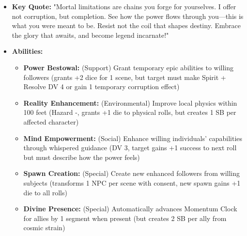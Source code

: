 \documentclass[11pt]{article}
\begin{document}
\begin{itemize}
  \item \textbf{Key Quote:} "Mortal limitations are chains you forge for yourselves. I offer not corruption, but completion. See how the power flows through you—this is what you were meant to be. Resist not the coil that shapes destiny. Embrace the glory that awaits, and become legend incarnate!"
  \item \textbf{Abilities:}
    \begin{itemize}
    \item \textbf{Power Bestowal:} (Support) Grant temporary epic abilities to willing followers (grants +2 dice for 1 scene, but target must make Spirit + Resolve DV 4 or gain 1 temporary corruption effect)
    \item \textbf{Reality Enhancement:} (Environmental) Improve local physics within 100 feet (Hazard -, grants +1 die to physical rolls, but creates 1 SB per affected character)
    \item \textbf{Mind Empowerment:} (Social) Enhance willing individuals' capabilities through whispered guidance (DV 3, target gains +1 success to next roll but must describe how the power feels)
    \item \textbf{Spawn Creation:} (Special) Create new enhanced followers from willing subjects (transforms 1 NPC per scene with consent, new spawn gains +1 die to all rolls)
    \item \textbf{Divine Presence:} (Special) Automatically advances Momentum Clock for allies by 1 segment when present (but creates 2 SB per ally from cosmic strain)
    \end{itemize}
\end{itemize}
\end{document}
